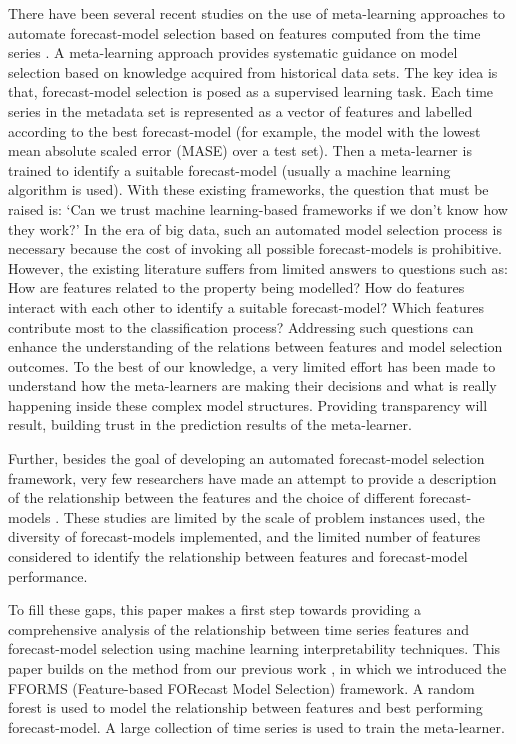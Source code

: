 \documentclass[11pt,a4paper,]{article}
\begin{document}
There have been several recent studies on the use of meta-learning approaches to automate forecast-model selection based on features computed from the time series \autocites{shah1997model}{prudencio2004meta}{lemke2010meta}{kuck2016meta}. A meta-learning approach provides systematic guidance on model selection based on knowledge acquired from historical data sets. The key idea is that, forecast-model selection is posed as a supervised learning task. Each time series in the metadata set is represented as a vector of features and labelled according to the best forecast-model (for example, the model with the lowest mean absolute scaled error (MASE) over a test set). Then a meta-learner is trained to identify a suitable forecast-model (usually a machine learning algorithm is used). With these existing frameworks, the question that must be raised is: `Can we trust machine learning-based frameworks if we don't know how they work?' In the era of big data, such an automated model selection process is necessary because the cost of invoking all possible forecast-models is prohibitive. However, the existing literature suffers from limited answers to questions such as: How are features related to the property being modelled? How do features interact with each other to identify a suitable forecast-model? Which features contribute most to the classification process? Addressing such questions can enhance the understanding of the relations between features and model selection outcomes. To the best of our knowledge, a very limited effort has been made to understand how the meta-learners are making their decisions and what is really happening inside these complex model structures. Providing transparency will result, building trust in the prediction results of the meta-learner.

Further, besides the goal of developing an automated forecast-model selection framework, very few researchers have made an attempt to provide a description of the relationship between the features and the choice of different forecast-models \autocites{schnaars1984situational}{wang2009rule}{lemke2010meta}[ are among some exceptions]{petropoulos2014horses}. These studies are limited by the scale of problem instances used, the diversity of forecast-models implemented, and the limited number of features considered to identify the relationship between features and forecast-model performance.

To fill these gaps, this paper makes a first step towards providing a comprehensive analysis of the relationship between time series features and forecast-model selection using machine learning interpretability techniques. This paper builds on the method from our previous work \textcite{fforms}, in which we introduced the FFORMS (Feature-based FORecast Model Selection) framework. A random forest is used to model the relationship between features and best performing forecast-model. A large collection of time series is used to train the meta-learner.
\end{document}
